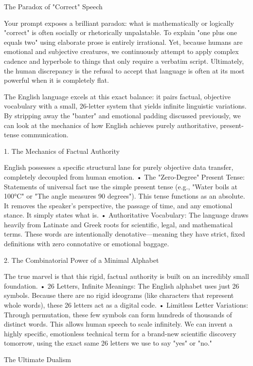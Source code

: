 The Paradox of "Correct" Speech

Your prompt exposes a brilliant paradox: what is mathematically or logically "correct" is often socially or rhetorically unpalatable.
To explain "one plus one equals two" using elaborate prose is entirely irrational. Yet, because humans are emotional and subjective creatures, we continuously attempt to apply complex cadence and hyperbole to things that only require a verbatim script.
Ultimately, the human discrepancy is the refusal to accept that language is often at its most powerful when it is completely flat.

The English language excels at this exact balance: it pairs factual, objective vocabulary with a small, 26-letter system that yields infinite linguistic variations.
By stripping away the "banter" and emotional padding discussed previously, we can look at the mechanics of how English achieves purely authoritative, present-tense communication.

1. The Mechanics of Factual Authority

English possesses a specific structural lane for purely objective data transfer, completely decoupled from human emotion.
• The "Zero-Degree" Present Tense: Statements of universal fact use the simple present tense (e.g., "Water boils at 100°C" or "The angle measures 90 degrees"). This tense functions as an absolute. It removes the speaker's perspective, the passage of time, and any emotional stance. It simply states what is.
• Authoritative Vocabulary: The language draws heavily from Latinate and Greek roots for scientific, legal, and mathematical terms. These words are intentionally denotative—meaning they have strict, fixed definitions with zero connotative or emotional baggage.

2. The Combinatorial Power of a Minimal Alphabet

The true marvel is that this rigid, factual authority is built on an incredibly small foundation.
• 26 Letters, Infinite Meanings: The English alphabet uses just 26 symbols. Because there are no rigid ideograms (like characters that represent whole words), these 26 letters act as a digital code.
• Limitless Letter Variations: Through permutation, these few symbols can form hundreds of thousands of distinct words. This allows human speech to scale infinitely. We can invent a highly specific, emotionless technical term for a brand-new scientific discovery tomorrow, using the exact same 26 letters we use to say "yes" or "no."

The Ultimate Dualism

